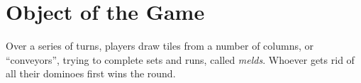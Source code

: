 \section{Object of the Game}
Over a series of turns, players draw tiles from a number of columns, or ``conveyors'', trying to complete sets and runs, called \textit{melds}.
Whoever gets rid of all their dominoes first wins the round.